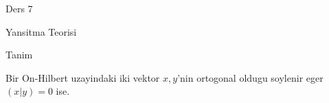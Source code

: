 \documentclass[12pt,fleqn]{article}\usepackage{../common}
\begin{document}
Ders 7

Yansitma Teorisi 

Tanim 

Bir On-Hilbert uzayindaki iki vektor $x,y$'nin ortogonal oldugu soylenir
eger $(x|y) = 0$ ise. 
\end{document}
